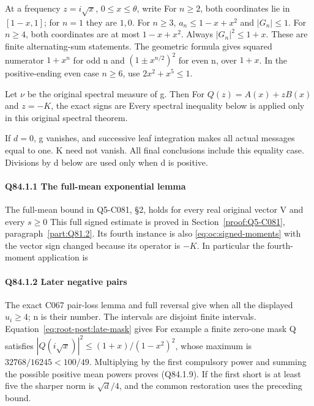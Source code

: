 At a frequency \(z=i\sqrt x\), \(0\le x\le\theta\), write
For \(n\ge2\), both coordinates lie in \([1-x,\allowbreak  1]\); for \(n=1\) they
are \(1,\allowbreak  0\). For \(n\ge3\), \(a_n\le1-x+x^2\) and \(|G_n|\le1\).
For \(n\ge4\), both coordinates are at most \(1-x+x^2\).
Always \(|G_n|^2\le1+x\). These are finite alternating-sum statements.
The geometric formula gives squared numerator \(1+x^n\) for odd n and
\((1\pm x^{n/2})^2\) for even n, over \(1+x\). In the positive-ending
even case \(n\ge6\), use \(2x^2+x^5\le1\).

Let \(\nu\) be the original spectral measure of g. Then
For \(Q(z)=A(x)+zB(x)\) and \(z=-K\), the exact signs are
Every spectral inequality below is applied only in this original spectral
theorem. 

If \(d=0\), g vanishes, and successive leaf integration makes all actual
messages equal to one. K need not vanish. All final conclusions include
this equality case. Divisions by d below are used only when d is positive.

\paragraph{Q84.1.1 The full-mean exponential lemma}

The full-mean bound in Q5-C081, §2, holds for every
real original vector V and every \(s\ge0\)
This full signed estimate is proved in
Section~\ref{proof:Q5-C081}, paragraph~\ref{part:Q81.2}.
Its fourth instance is also \eqref{eq:oc:signed-moments} with the
vector sign changed because its operator is \(-K\). In particular
the fourth-moment application is

\paragraph{Q84.1.2 Later negative pairs}

The exact C067 pair-loss lemma and full reversal give
when all the displayed \(u_i\ge4\); n is their number. The intervals
are disjoint finite intervals. Equation~\eqref{eq:root-post:late-mask}
gives
For example a finite zero-one mask Q satisfies
\(|Q(i\sqrt x)|^2\le(1+x)/(1-x^2)^2\), whose maximum is
\(32768/16245<100/49\). Multiplying by the first compulsory power
and summing the possible positive mean powers proves (Q84.1.9). If the first
short is at least five the sharper norm is \(\sqrt d/4\), and the common restoration uses the preceding bound.


